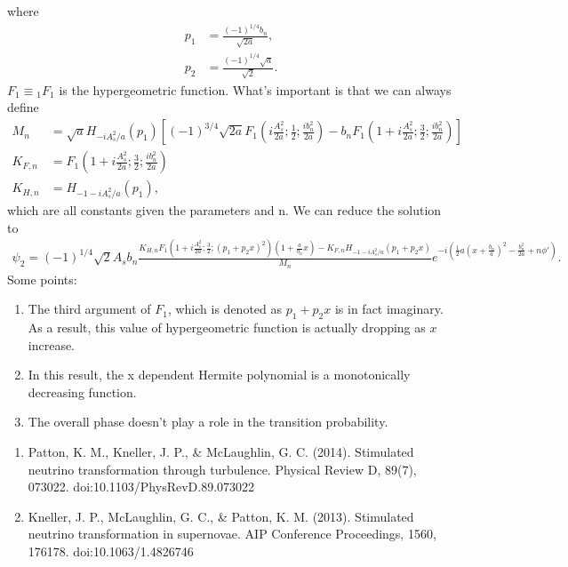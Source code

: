 \documentclass[letterpaper,12pt,english]{sphinxmanual}
\begin{document}
where
\begin{equation*}
\begin{split}p_1 & = \frac{(-1)^{1/4} b_n}{\sqrt{2a}}, \\
p_2 & = \frac{ (-1)^{1/4} \sqrt{a}  }{ \sqrt{2} }.\end{split}
\end{equation*}
\(F_1\equiv {}_1 F_1\) is the hypergeometric function. What's important is that we can always define
\begin{equation*}
\begin{split}M_n & =  \sqrt{a} H_{-i A_s^2/a} (p_1) \left[ (-1)^{3/4} \sqrt{2a} F_1 \left(  i \frac{A_s^2}{2a};\frac{1}{2};\frac{i b_n^2}{2a} \right) - b_n F_1 \left(  1 + i \frac{A_s^2}{2a};\frac{3}{2};\frac{i b_n^2}{2a} \right) \right] \\
K_{F,n} &= F_1 \left( 1 + i \frac{A_s^2}{2a};\frac{3}{2};\frac{i b_n^2}{2a} \right) \\
K_{H,n} &= H_{-1 - i A_s^2/a} (p_1),\end{split}
\end{equation*}
which are all constants given the parameters and n. We can reduce the solution to
\begin{equation*}
\begin{split}\psi_2 =  (-1)^{1/4} \sqrt{2} A_s b_n \frac{K_{H,n} F_1 \left( 1 + i \frac{A_s^2}{2a};\frac{3}{2}; (p_1 + p_2 x)^2\right) (1+\frac{a}{b_n} x) - K_{F,n} H_{-1 - i A_s^2/a} (p_1 + p_2 x) }{ M_n } e^{-i \left( \frac{1}{2} a \left( x + \frac{b_n}{a} \right)^2 - \frac{b_n^2}{2a} + n\phi'  \right) }.\end{split}
\end{equation*}
Some points:
\begin{enumerate}
\item {} 
The third argument of \(F_1\), which is denoted as \(p_1 +p_2 x\) is in fact imaginary. As a result, this value of hypergeometric function is actually dropping as \(x\) increase.

\item {} 
In this result, the x dependent Hermite polynomial is a monotonically decreasing function.

\item {} 
The overall phase doesn't play a role in the transition probability.

\end{enumerate}
\begin{enumerate}
\item {} 
Patton, K. M., Kneller, J. P., \& McLaughlin, G. C. (2014). Stimulated neutrino transformation through turbulence. Physical Review D, 89(7), 073022. doi:10.1103/PhysRevD.89.073022

\item {} 
Kneller, J. P., McLaughlin, G. C., \& Patton, K. M. (2013). Stimulated neutrino transformation in supernovae. AIP Conference Proceedings, 1560, 176\textendash{}178. doi:10.1063/1.4826746

\end{enumerate}
\end{document}
